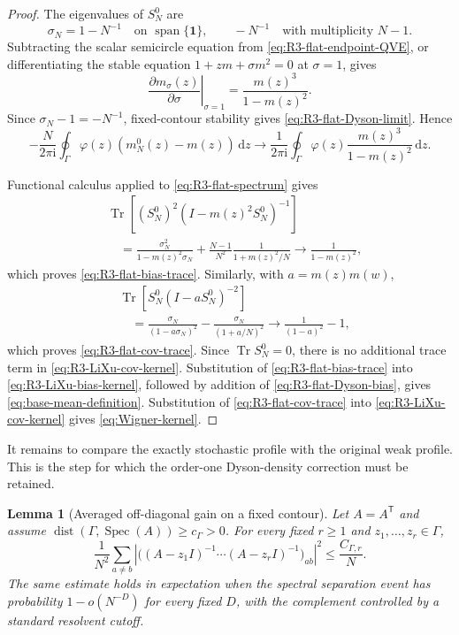 \documentclass[11pt]{article}
\newtheorem{lemma}[theorem]{Lemma}
\theoremstyle{definition}
\theoremstyle{remark}
\newcommand{\Tr}{\operatorname{Tr}}
\newcommand{\spec}{\operatorname{Spec}}
\newcommand{\ii}{\mathrm i}
\newcommand{\dd}{\mathrm d}
\newcommand{\one}{\mathbf 1}
\begin{document}
\begin{proof}
The eigenvalues of \(S_N^0\) are
\begin{equation}\label{eq:R3-flat-spectrum}
 \sigma_N=1-N^{-1}
 \quad\text{on }\operatorname{span}\{\one\},
 \qquad
 -N^{-1}
 \quad\text{with multiplicity }N-1.
\end{equation}
Subtracting the scalar semicircle equation from
\eqref{eq:R3-flat-endpoint-QVE}, or differentiating the stable equation
\(1+zm+\sigma m^2=0\) at \(\sigma=1\), gives
\[
 \left.\frac{\partial m_\sigma(z)}{\partial\sigma}\right|_{\sigma=1}
 =\frac{m(z)^3}{1-m(z)^2}.
\]
Since \(\sigma_N-1=-N^{-1}\), fixed-contour stability gives
\eqref{eq:R3-flat-Dyson-limit}.  Hence
\begin{equation}\label{eq:R3-flat-Dyson-bias}
 -\frac{N}{2\pi\ii}\oint_\Gamma
 \varphi(z)(m_N^0(z)-m(z))\,\dd z
 \longrightarrow
 \frac{1}{2\pi\ii}\oint_\Gamma
 \varphi(z)\frac{m(z)^3}{1-m(z)^2}\,\dd z.
\end{equation}

Functional calculus applied to \eqref{eq:R3-flat-spectrum} gives
\begin{align*}
 &\Tr\!\left[(S_N^0)^2(I-m(z)^2S_N^0)^{-1}\right]\\
 &\quad=
 \frac{\sigma_N^2}{1-m(z)^2\sigma_N}
 +\frac{N-1}{N^2}\frac{1}{1+m(z)^2/N}
 \longrightarrow\frac{1}{1-m(z)^2},
\end{align*}
which proves \eqref{eq:R3-flat-bias-trace}.  Similarly, with
\(a=m(z)m(w)\),
\begin{align*}
 &\Tr\!\left[S_N^0(I-aS_N^0)^{-2}\right]\\
 &\quad=
 \frac{\sigma_N}{(1-a\sigma_N)^2}
 -\frac{\sigma_N}{(1+a/N)^2}
 \longrightarrow\frac{1}{(1-a)^2}-1,
\end{align*}
which proves \eqref{eq:R3-flat-cov-trace}.  Since \(\Tr S_N^0=0\), there is
no additional trace term in \eqref{eq:R3-LiXu-cov-kernel}.  Substitution of
\eqref{eq:R3-flat-bias-trace} into \eqref{eq:R3-LiXu-bias-kernel}, followed by
addition of \eqref{eq:R3-flat-Dyson-bias}, gives
\eqref{eq:base-mean-definition}.  Substitution of
\eqref{eq:R3-flat-cov-trace} into \eqref{eq:R3-LiXu-cov-kernel} gives
\eqref{eq:Wigner-kernel}.
\end{proof}

It remains to compare the exactly stochastic profile with the original weak
profile.  This is the step for which the order-one Dyson-density correction
must be retained.

\begin{lemma}[Averaged off-diagonal gain on a fixed contour]
\label{lem:R3-averaged-offdiag}
Let \(A=A^{\mathsf T}\) and assume
\(\operatorname{dist}(\Gamma,\spec(A))\ge c_\Gamma>0\).  For every fixed
\(r\ge1\) and \(z_1,\ldots,z_r\in\Gamma\),
\begin{equation}\label{eq:R3-deterministic-offdiag}
 \frac1{N^2}\sum_{a\ne b}
 \left|
 \bigl((A-z_1I)^{-1}\cdots(A-z_rI)^{-1}\bigr)_{ab}
 \right|^2
 \le\frac{C_{\Gamma,r}}{N}.
\end{equation}
The same estimate holds in expectation when the spectral separation event has
probability \(1-o(N^{-D})\) for every fixed \(D\), with the complement
controlled by a standard resolvent cutoff.
\end{lemma}
\end{document}
